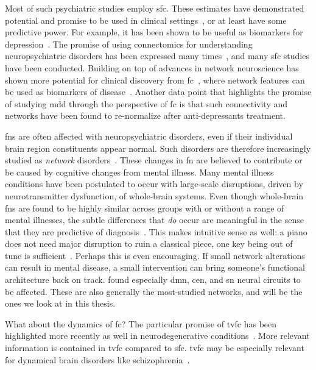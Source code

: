 Most of such psychiatric studies employ \gls{sfc}.
These estimates have demonstrated potential and promise to be used in clinical settings~\parencite{Cole2014, Deco2014, Parkes2020}, or at least have some predictive power.
For example, it has been shown to be useful as biomarkers for depression~\parencite{Drysdale2017}.
The promise of using connectomics for understanding neuropsychiatric disorders has been expressed many times~\parencite{Deco2014}, and many \gls{sfc} studies have been conducted.
Building on top of advances in network neuroscience has shown more potential for clinical discovery from \gls{fc}~\parencite{Lydon-Staley2018}, where network features can be used as biomarkers of disease~\parencite{Bassett2009}.
Another data point that highlights the promise of studying \gls{mdd} through the perspective of \gls{fc} is that such connectivity and networks have been found to re-normalize after anti-depressants treatment.

\Glspl{fn} are often affected with neuropsychiatric disorders, even if their individual brain region constituents appear normal.
Such disorders are therefore increasingly studied as \emph{network} disorders~\parencite{Mulders2015}.
These changes in \gls{fn} are believed to contribute or be caused by cognitive changes from mental illness.
Many mental illness conditions have been postulated to occur with large-scale disruptions, driven by neurotransmitter dysfunction, of whole-brain systems.
Even though whole-brain \glspl{fn} are found to be highly similar across groups with or without a range of mental illnesses, the subtle differences that \emph{do} occur are meaningful in the sense that they are predictive of diagnosis~\parencite{Spronk2020}.
This makes intuitive sense as well: a piano does not need major disruption to ruin a classical piece, one key being out of tune is sufficient~\parencite[see also][for a discussion of small effect sizes]{Paulus2019}.
Perhaps this is even encouraging.
If small network alterations can result in mental disease, a small intervention can bring someone's functional architecture back on track.
\textcite{Mulders2015} found especially \gls{dmn}, \gls{cen}, and \gls{sn} neural circuits to be affected.
These are also generally the most-studied networks, and will be the ones we look at in this thesis.

What about the dynamics of \gls{fc}?
The particular promise of \gls{tvfc} has been highlighted more recently as well in neurodegenerative conditions~\parencite{Filippi2019}.
More relevant information is contained in \gls{tvfc} compared to \gls{sfc}.
\gls{tvfc} may be especially relevant for dynamical brain disorders like schizophrenia~\parencite{Jin2017}.

